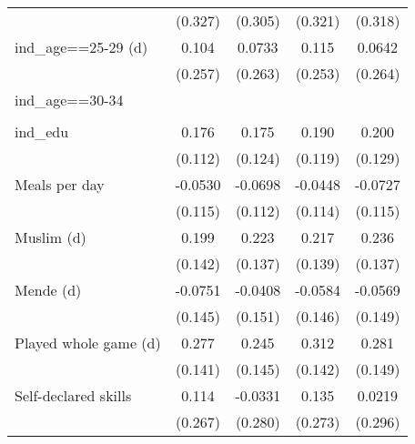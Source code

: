 {\begin{tabular}{l*{4}{c}}
                    &     (0.327)         &     (0.305)         &     (0.321)         &     (0.318)         \\
[1em]
ind\_age==25-29 (d)  &       0.104         &      0.0733         &       0.115         &      0.0642         \\
                    &     (0.257)         &     (0.263)         &     (0.253)         &     (0.264)         \\
[1em]
ind\_age==30-34      &                     &                     &                     &                     \\
                    &                     &                     &                     &                     \\
[1em]
ind\_edu             &       0.176         &       0.175         &       0.190         &       0.200         \\
                    &     (0.112)         &     (0.124)         &     (0.119)         &     (0.129)         \\
[1em]
Meals per day       &     -0.0530         &     -0.0698         &     -0.0448         &     -0.0727         \\
                    &     (0.115)         &     (0.112)         &     (0.114)         &     (0.115)         \\
[1em]
Muslim (d)          &       0.199         &       0.223         &       0.217         &       0.236\sym{*}  \\
                    &     (0.142)         &     (0.137)         &     (0.139)         &     (0.137)         \\
[1em]
Mende (d)           &     -0.0751         &     -0.0408         &     -0.0584         &     -0.0569         \\
                    &     (0.145)         &     (0.151)         &     (0.146)         &     (0.149)         \\
[1em]
Played whole game (d)&       0.277\sym{**} &       0.245\sym{*}  &       0.312\sym{**} &       0.281\sym{*}  \\
                    &     (0.141)         &     (0.145)         &     (0.142)         &     (0.149)         \\
[1em]
Self-declared skills&       0.114         &     -0.0331         &       0.135         &      0.0219         \\
                    &     (0.267)         &     (0.280)         &     (0.273)         &     (0.296)         \\

\end{tabular}}
